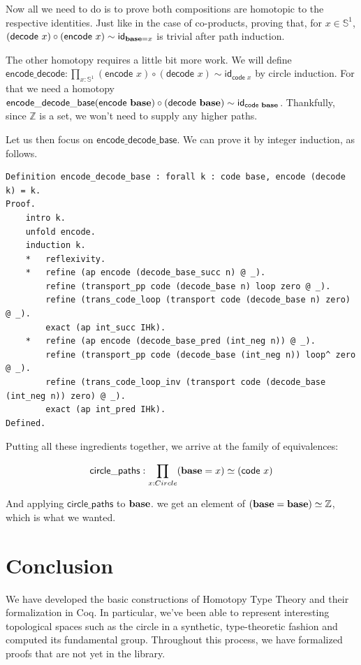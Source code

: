 \documentclass[12 pt]{amsart}
\theoremstyle{definition}
\theoremstyle{remark}
\newcommand{\base}{\mathsf{\bf base}}
\newcommand{\C}{{\mathbb{S}^1}}
\newcommand{\id}{{\mathsf{id}}}
\newcommand{\code}{{\mathsf{ code}\,}}
\newcommand{\encode}{{\mathsf{ encode}\,}}
\newcommand{\decode}{{\mathsf{ decode}\,}}
\newcommand{\circlepaths}{\mathsf{circle\_paths}}
\newcommand{\encodedecodebase}{\mathsf{encode\_decode\_base}}
\newcommand{\encodedecode}{\mathsf{encode\_decode}}
\begin{document}
Now all we need to do is to prove both compositions are homotopic to the respective identities. Just like in the case of co-products, proving that, for $x\in\C$, $(\decode \,x)\circ (\encode \,x) \sim \id_{\base = x}$ is trivial after path induction.

The other homotopy requires a little bit more work. We will define $\encodedecode : \prod_{x : \C}  (\encode\, x) \circ (\decode\,x) \sim \id_{\code\, x}$ by circle induction. For that we need a homotopy $\encodedecodebase (\encode\, \base ) \circ (\decode\, \base) \sim \id_{\code\, \base}$. Thankfully, since $\mathbb{Z}$ is a set, we won't need to supply any higher paths.

Let us then focus on $\encodedecodebase$. We can prove it by integer induction, as follows.

\begin{lstlisting}
Definition encode_decode_base : forall k : code base, encode (decode k) = k.
Proof.
    intro k.
    unfold encode.
    induction k.
    *   reflexivity.
    *   refine (ap encode (decode_base_succ n) @ _).
        refine (transport_pp code (decode_base n) loop zero @ _).
        refine (trans_code_loop (transport code (decode_base n) zero) @ _).
        exact (ap int_succ IHk).
    *   refine (ap encode (decode_base_pred (int_neg n)) @ _).
        refine (transport_pp code (decode_base (int_neg n)) loop^ zero @ _).
        refine (trans_code_loop_inv (transport code (decode_base (int_neg n)) zero) @ _).
        exact (ap int_pred IHk).
Defined.  

\end{lstlisting}

Putting all these ingredients together, we arrive at the family of equivalences:

\[\circlepaths: \prod_{x : Circle} (\base = x) \simeq (\code\, x)\]

And applying $\circlepaths$ to $\base$. we get an element of $(\base = \base) \simeq \mathbb{Z}$, which is what we wanted.

\section{Conclusion}
We have developed the basic constructions of Homotopy Type Theory and their formalization in Coq. In particular, we've been able to represent interesting topological spaces such as the circle in a synthetic, type-theoretic fashion and computed its fundamental group. Throughout this process, we have formalized proofs that are not yet in the library.
\newpage
\printbibliography
\end{document}
